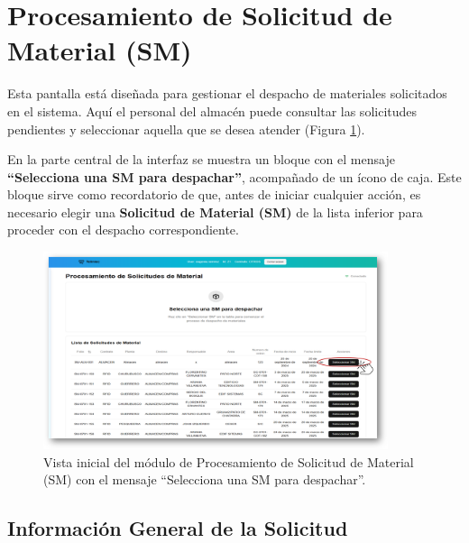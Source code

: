 \section{Procesamiento de Solicitud de Material (SM)}
\vspace{-0.5em}
\begin{justify}
    
    Esta pantalla está diseñada para gestionar el despacho de materiales solicitados en el sistema.  
    Aquí el personal del almacén puede consultar las solicitudes pendientes y seleccionar aquella que se desea atender (Figura \ref{fig:procesamiento_sm}).
    
    En la parte central de la interfaz se muestra un bloque con el mensaje \textbf{“Selecciona una SM para despachar”}, acompañado de un ícono de caja.  
    Este bloque sirve como recordatorio de que, antes de iniciar cualquier acción, es necesario elegir una \textbf{Solicitud de Material (SM)} de la lista inferior para proceder con el despacho correspondiente.
\end{justify}

\begin{figure}[H]
    \centering
    \includegraphics[width=0.9\textwidth]{imgs/Almacen_General/Procesamiento_SM/procesamiento_general.png}
    \caption{Vista inicial del módulo de Procesamiento de Solicitud de Material (SM) con el mensaje “Selecciona una SM para despachar”.}
    \label{fig:procesamiento_sm}
\end{figure}

\subsection{Información General de la Solicitud}

\vspace{-0.5em} %

